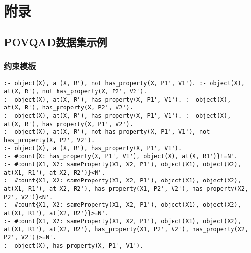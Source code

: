 \chapter{附录}
\section{POVQAD数据集示例}
\subsection{约束模板}
\label{appendix:constraints}
\begin{lstlisting}
:- object(X), at(X, R'), not has_property(X, P1', V1'). :- object(X), at(X, R'), not has_property(X, P2', V2').
:- object(X), at(X, R'), has_property(X, P1', V1'). :- object(X), at(X, R'), has_property(X, P2', V2').
:- object(X), at(X, R'), has_property(X, P1', V1'). :- object(X), at(X, R'), has_property(X, P1', V2').
:- object(X), at(X, R'), not has_property(X, P1', V1'), not has_property(X, P2', V2').
:- object(X), at(X, R'), has_property(X, P1', V1').
:- #count{X: has_property(X, P1', V1'), object(X), at(X, R1')}!=N'.
:- #count{X1, X2: sameProperty(X1, X2, P1'), object(X1), object(X2), at(X1, R1'), at(X2, R2')}<N'.
:- #count{X1, X2: sameProperty(X1, X2, P1'), object(X1), object(X2), at(X1, R1'), at(X2, R2'), has_property(X1, P2', V2'), has_property(X2, P2', V2')}<N'.
:- #count{X1, X2: sameProperty(X1, X2, P1'), object(X1), object(X2), at(X1, R1'), at(X2, R2')}>=N'.
:- #count{X1, X2: sameProperty(X1, X2, P1'), object(X1), object(X2), at(X1, R1'), at(X2, R2'), has_property(X1, P2', V2'), has_property(X2, P2', V2')}>=N'.
:- object(X), has_property(X, P1', V1').
\end{lstlisting}
